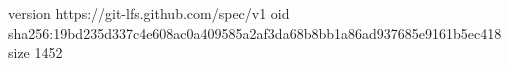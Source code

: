 version https://git-lfs.github.com/spec/v1
oid sha256:19bd235d337c4e608ac0a409585a2af3da68b8bb1a86ad937685e9161b5ec418
size 1452
